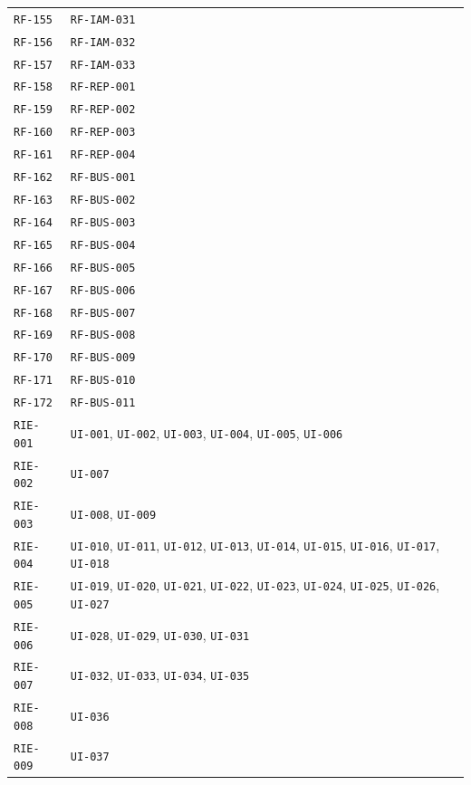 \documentclass[10pt,letterpaper]{article}
\begin{document}
\begin{longtable}{P{3.0cm}P{10.6cm}}
\texttt{RF-155} & \texttt{RF-IAM-031}\\
\texttt{RF-156} & \texttt{RF-IAM-032}\\
\texttt{RF-157} & \texttt{RF-IAM-033}\\
\texttt{RF-158} & \texttt{RF-REP-001}\\
\texttt{RF-159} & \texttt{RF-REP-002}\\
\texttt{RF-160} & \texttt{RF-REP-003}\\
\texttt{RF-161} & \texttt{RF-REP-004}\\
\texttt{RF-162} & \texttt{RF-BUS-001}\\
\texttt{RF-163} & \texttt{RF-BUS-002}\\
\texttt{RF-164} & \texttt{RF-BUS-003}\\
\texttt{RF-165} & \texttt{RF-BUS-004}\\
\texttt{RF-166} & \texttt{RF-BUS-005}\\
\texttt{RF-167} & \texttt{RF-BUS-006}\\
\texttt{RF-168} & \texttt{RF-BUS-007}\\
\texttt{RF-169} & \texttt{RF-BUS-008}\\
\texttt{RF-170} & \texttt{RF-BUS-009}\\
\texttt{RF-171} & \texttt{RF-BUS-010}\\
\texttt{RF-172} & \texttt{RF-BUS-011}\\
\texttt{RIE-001} & \texttt{UI-001}, \texttt{UI-002}, \texttt{UI-003}, \texttt{UI-004}, \texttt{UI-005}, \texttt{UI-006}\\
\texttt{RIE-002} & \texttt{UI-007}\\
\texttt{RIE-003} & \texttt{UI-008}, \texttt{UI-009}\\
\texttt{RIE-004} & \texttt{UI-010}, \texttt{UI-011}, \texttt{UI-012}, \texttt{UI-013}, \texttt{UI-014}, \texttt{UI-015}, \texttt{UI-016}, \texttt{UI-017}, \texttt{UI-018}\\
\texttt{RIE-005} & \texttt{UI-019}, \texttt{UI-020}, \texttt{UI-021}, \texttt{UI-022}, \texttt{UI-023}, \texttt{UI-024}, \texttt{UI-025}, \texttt{UI-026}, \texttt{UI-027}\\
\texttt{RIE-006} & \texttt{UI-028}, \texttt{UI-029}, \texttt{UI-030}, \texttt{UI-031}\\
\texttt{RIE-007} & \texttt{UI-032}, \texttt{UI-033}, \texttt{UI-034}, \texttt{UI-035}\\
\texttt{RIE-008} & \texttt{UI-036}\\
\texttt{RIE-009} & \texttt{UI-037}\\

\end{longtable}
\end{document}
